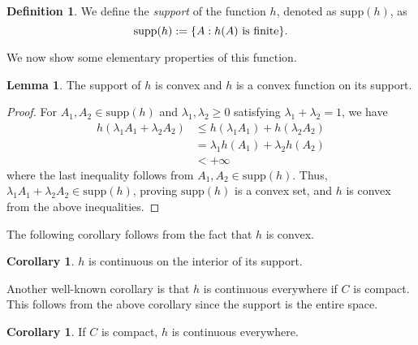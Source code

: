\documentclass[11pt]{article}
\theoremstyle{definition}
\newtheorem{lemma}[theorem]{Lemma}
\newtheorem{corollary}[theorem]{Corollary}
\theoremstyle{definition}
\newtheorem{definition}[theorem]{Definition}
\newcommand{\supp}{\mathrm{supp}}
\begin{document}
\begin{definition} 
We define the \emph{support} of the function $h$, denoted as $\supp(h)$, as 
\begin{equation} 
\supp(h) := \{ A : h(A) \textup{ is finite} \}.  
\end{equation} 
\end{definition} 

We now show some elementary properties of this function. 

\begin{lemma} 
The support of $h$ is convex and $h$ is a convex function on its support. 
\end{lemma} 

\begin{proof} 
For $A_1, A_2 \in \supp(h)$ and $\lambda_1, \lambda_2 \geq 0$ satisfying $\lambda_1 + \lambda_2 = 1$, we have  
\begin{align}
h(\lambda_1 A_1 + \lambda_2 A_2) 
& \leq h(\lambda_1 A_1) + h(\lambda_2 A_2) \\ 
& = \lambda_1 h(A_1) + \lambda_2 h(A_2) \\ 
& < + \infty  
\end{align} 
where the last inequality follows from $A_1, A_2 \in \supp(h)$.  
Thus, $\lambda_1 A_1 + \lambda_2 A_2 \in \supp(h)$, proving $\supp(h)$ is a convex set, and $h$ is convex from the above inequalities. 
\end{proof} 

The following corollary follows from the fact that $h$ is convex. 

\begin{corollary} \label{contint}
$h$ is continuous on the interior of its support. 
\end{corollary} 

Another well-known corollary is that $h$ is 
continuous everywhere if $C$ is compact. 
This follows from the above corollary since the support is the entire space. 

\begin{corollary} \label{contint}
If $C$ is compact, $h$ is continuous everywhere. 
\end{corollary} 

\end{document}
